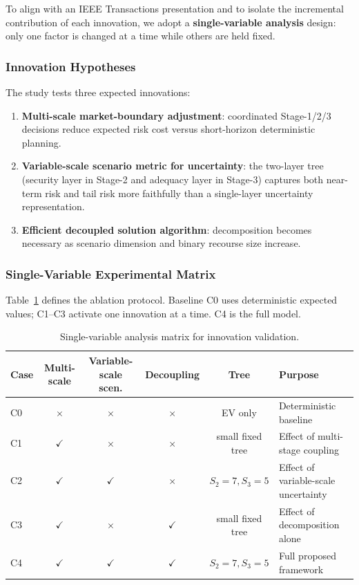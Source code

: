 \documentclass[11pt]{article}
\begin{document}
To align with an IEEE Transactions presentation and to isolate the
incremental contribution of each innovation, we adopt a
\textbf{single-variable analysis} design: only one factor is changed at
a time while others are held fixed.

\subsubsection{Innovation Hypotheses}

The study tests three expected innovations:
\begin{enumerate}
  \item \textbf{Multi-scale market-boundary adjustment}:
    coordinated Stage-1/2/3 decisions reduce expected risk cost
    versus short-horizon deterministic planning.
  \item \textbf{Variable-scale scenario metric for uncertainty}:
    the two-layer tree (security layer in Stage-2 and adequacy
    layer in Stage-3) captures both near-term risk and tail risk
    more faithfully than a single-layer uncertainty representation.
  \item \textbf{Efficient decoupled solution algorithm}:
    decomposition becomes necessary as scenario dimension and binary
    recourse size increase.
\end{enumerate}

\subsubsection{Single-Variable Experimental Matrix}

Table~\ref{tab:ieee-sva} defines the ablation protocol. Baseline C0
uses deterministic expected values; C1--C3 activate one innovation at a
time. C4 is the full model.

\begin{table}[H]
\centering
\caption{Single-variable analysis matrix for innovation validation.}
\label{tab:ieee-sva}
\small
\begin{tabular}{lccccl}
\toprule
\textbf{Case} & \textbf{Multi-scale} & \textbf{Variable-scale scen.} & \textbf{Decoupling} & \textbf{Tree} & \textbf{Purpose} \\
\midrule
C0 & $\times$ & $\times$ & $\times$ & EV only & Deterministic baseline \\
C1 & $\checkmark$ & $\times$ & $\times$ & small fixed tree & Effect of multi-stage coupling \\
C2 & $\checkmark$ & $\checkmark$ & $\times$ & $S_2{=}7,S_3{=}5$ & Effect of variable-scale uncertainty \\
C3 & $\checkmark$ & $\times$ & $\checkmark$ & small fixed tree & Effect of decomposition alone \\
C4 & $\checkmark$ & $\checkmark$ & $\checkmark$ & $S_2{=}7,S_3{=}5$ & Full proposed framework \\
\bottomrule
\end{tabular}
\end{table}
\end{document}
